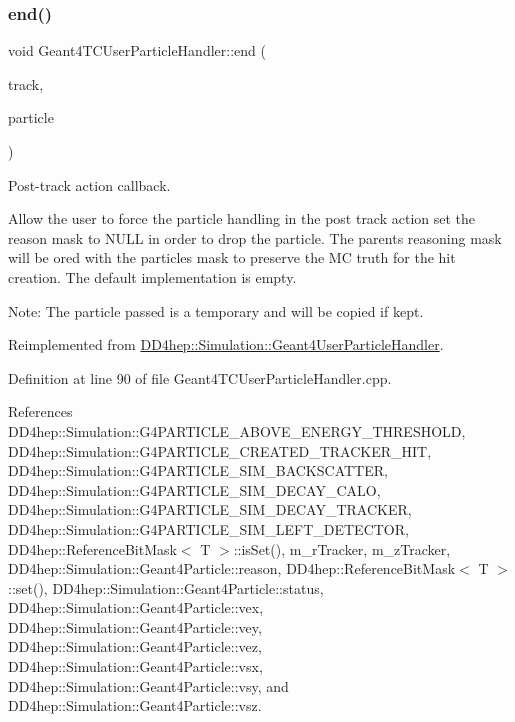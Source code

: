 \subsubsection{\texorpdfstring{end()}{end()}\hspace{0.1cm}{\footnotesize\ttfamily [1/2]}}
{\footnotesize\ttfamily void Geant4\+T\+C\+User\+Particle\+Handler\+::end (\begin{DoxyParamCaption}\item[{const G4\+Track $\ast$}]{track,  }\item[{\hyperlink{class_d_d4hep_1_1_simulation_1_1_geant4_user_particle_handler_a0222f326d539ff27c6c446a7a30e8e26}{Particle} \&}]{particle }\end{DoxyParamCaption})\hspace{0.3cm}{\ttfamily [virtual]}}



Post-\/track action callback. 

Allow the user to force the particle handling in the post track action set the reason mask to N\+U\+LL in order to drop the particle. The parent\textquotesingle{}s reasoning mask will be or\textquotesingle{}ed with the particle\textquotesingle{}s mask to preserve the MC truth for the hit creation. The default implementation is empty.

Note\+: The particle passed is a temporary and will be copied if kept. 

Reimplemented from \hyperlink{class_d_d4hep_1_1_simulation_1_1_geant4_user_particle_handler_a327d267d834a00157ebd0b1e99e1685c}{D\+D4hep\+::\+Simulation\+::\+Geant4\+User\+Particle\+Handler}.



Definition at line 90 of file Geant4\+T\+C\+User\+Particle\+Handler.\+cpp.



References D\+D4hep\+::\+Simulation\+::\+G4\+P\+A\+R\+T\+I\+C\+L\+E\+\_\+\+A\+B\+O\+V\+E\+\_\+\+E\+N\+E\+R\+G\+Y\+\_\+\+T\+H\+R\+E\+S\+H\+O\+LD, D\+D4hep\+::\+Simulation\+::\+G4\+P\+A\+R\+T\+I\+C\+L\+E\+\_\+\+C\+R\+E\+A\+T\+E\+D\+\_\+\+T\+R\+A\+C\+K\+E\+R\+\_\+\+H\+IT, D\+D4hep\+::\+Simulation\+::\+G4\+P\+A\+R\+T\+I\+C\+L\+E\+\_\+\+S\+I\+M\+\_\+\+B\+A\+C\+K\+S\+C\+A\+T\+T\+ER, D\+D4hep\+::\+Simulation\+::\+G4\+P\+A\+R\+T\+I\+C\+L\+E\+\_\+\+S\+I\+M\+\_\+\+D\+E\+C\+A\+Y\+\_\+\+C\+A\+LO, D\+D4hep\+::\+Simulation\+::\+G4\+P\+A\+R\+T\+I\+C\+L\+E\+\_\+\+S\+I\+M\+\_\+\+D\+E\+C\+A\+Y\+\_\+\+T\+R\+A\+C\+K\+ER, D\+D4hep\+::\+Simulation\+::\+G4\+P\+A\+R\+T\+I\+C\+L\+E\+\_\+\+S\+I\+M\+\_\+\+L\+E\+F\+T\+\_\+\+D\+E\+T\+E\+C\+T\+OR, D\+D4hep\+::\+Reference\+Bit\+Mask$<$ T $>$\+::is\+Set(), m\+\_\+r\+Tracker, m\+\_\+z\+Tracker, D\+D4hep\+::\+Simulation\+::\+Geant4\+Particle\+::reason, D\+D4hep\+::\+Reference\+Bit\+Mask$<$ T $>$\+::set(), D\+D4hep\+::\+Simulation\+::\+Geant4\+Particle\+::status, D\+D4hep\+::\+Simulation\+::\+Geant4\+Particle\+::vex, D\+D4hep\+::\+Simulation\+::\+Geant4\+Particle\+::vey, D\+D4hep\+::\+Simulation\+::\+Geant4\+Particle\+::vez, D\+D4hep\+::\+Simulation\+::\+Geant4\+Particle\+::vsx, D\+D4hep\+::\+Simulation\+::\+Geant4\+Particle\+::vsy, and D\+D4hep\+::\+Simulation\+::\+Geant4\+Particle\+::vsz.



